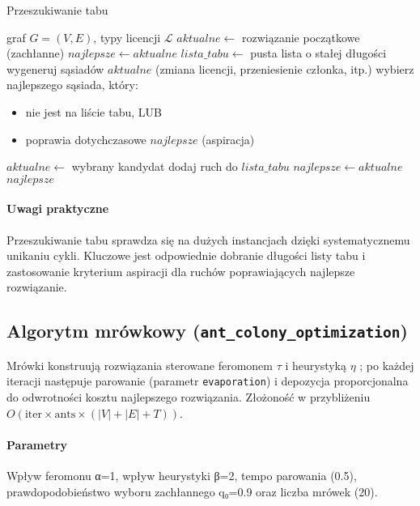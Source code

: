 \begin{algorithm}[H]
\caption{Przeszukiwanie tabu}
\label{alg:tabu}
\begin{algorithmic}[1]
\Require graf $G=(V,E)$, typy licencji $\mathcal{L}$
\State $aktualne \gets$ rozwiązanie początkowe (zachłanne)
\State $najlepsze \gets aktualne$
\State $lista\_tabu \gets$ pusta lista o stałej długości
  \State wygeneruj sąsiadów $aktualne$ (zmiana licencji, przeniesienie członka, itp.)
  \State wybierz najlepszego sąsiada, który:
  \begin{itemize}[noitemsep]
    \item nie jest na liście tabu, LUB
    \item poprawia dotychczasowe $najlepsze$ (aspiracja)
  \end{itemize}
    \State $aktualne \gets$ wybrany kandydat
    \State dodaj ruch do $lista\_tabu$
      \State $najlepsze \gets aktualne$
    \EndIf
  \EndIf
\EndFor
\State \Return $najlepsze$
\end{algorithmic}
\end{algorithm}

\paragraph{Uwagi praktyczne}
Przeszukiwanie tabu sprawdza się na dużych instancjach dzięki systematycznemu unikaniu cykli. Kluczowe jest odpowiednie dobranie długości listy tabu i zastosowanie kryterium aspiracji dla ruchów poprawiających najlepsze rozwiązanie.

\subsection{Algorytm mrówkowy (\texttt{ant\_colony\_optimization})}\label{subsec:aco}
Mrówki konstruują rozwiązania sterowane feromonem \(\tau\) i heurystyką \(\eta\) \cite{dorigo1997}; po każdej iteracji następuje parowanie (parametr \texttt{evaporation}) i depozycja proporcjonalna do odwrotności kosztu najlepszego rozwiązania. Złożoność w przybliżeniu \(O(\text{iter}\times\text{ants}\times(|V|+|E|+T))\).

\paragraph{Parametry}
Wpływ feromonu α=1, wpływ heurystyki β=2, tempo parowania (0.5), prawdopodobieństwo wyboru zachłannego q₀=0.9 oraz liczba mrówek (20).

